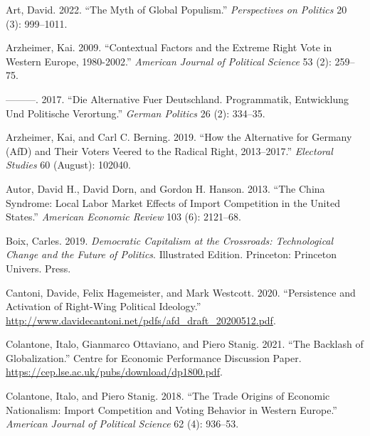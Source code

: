 \documentclass[
]{article}
\newlength{\cslhangindent}
\newlength{\cslentryspacingunit} %
\newenvironment{CSLReferences}[2] %
 {%
  \setlength{\parindent}{0pt}
  \ifodd #1
  \let\oldpar\par
  \def\par{\hangindent=\cslhangindent\oldpar}
  \fi
  \setlength{\parskip}{#2\cslentryspacingunit}
 }%
 {}
\begin{document}
\hypertarget{refs}{}
\begin{CSLReferences}{1}{0}
\leavevmode{}%
Art, David. 2022. {``The {Myth} of {Global} {Populism}.''}
\emph{Perspectives on Politics} 20 (3): 999--1011.

\leavevmode{}%
Arzheimer, Kai. 2009. {``Contextual {Factors} and the {Extreme} {Right}
{Vote} in {Western} {Europe}, 1980-2002.''} \emph{American Journal of
Political Science} 53 (2): 259--75.

\leavevmode{}%
---------. 2017. {``Die {Alternative} Fuer {Deutschland}.
{Programmatik}, {Entwicklung} Und Politische {Verortung}.''}
\emph{German Politics} 26 (2): 334--35.

\leavevmode{}%
Arzheimer, Kai, and Carl C. Berning. 2019. {``How the {Alternative} for
{Germany} ({AfD}) and Their Voters Veered to the Radical Right,
2013--2017.''} \emph{Electoral Studies} 60 (August): 102040.

\leavevmode{}%
Autor, David H., David Dorn, and Gordon H. Hanson. 2013. {``The {China}
{Syndrome}: {Local} {Labor} {Market} {Effects} of {Import} {Competition}
in the {United} {States}.''} \emph{American Economic Review} 103 (6):
2121--68.

\leavevmode{}%
Boix, Carles. 2019. \emph{Democratic {Capitalism} at the {Crossroads}:
{Technological} {Change} and the {Future} of {Politics}}. Illustrated
Edition. Princeton: Princeton Univers. Press.

\leavevmode{}%
Cantoni, Davide, Felix Hagemeister, and Mark Westcott. 2020.
{``Persistence and {Activation} of {Right}-{Wing} {Political}
{Ideology}.''}
\url{http://www.davidecantoni.net/pdfs/afd_draft_20200512.pdf}.

\leavevmode{}%
Colantone, Italo, Gianmarco Ottaviano, and Piero Stanig. 2021. {``The
Backlash of Globalization.''} Centre for {Economic} {Performance}
{Discussion} {Paper}.
\url{https://cep.lse.ac.uk/pubs/download/dp1800.pdf}.

\leavevmode{}%
Colantone, Italo, and Piero Stanig. 2018. {``The {Trade} {Origins} of
{Economic} {Nationalism}: {Import} {Competition} and {Voting} {Behavior}
in {Western} {Europe}.''} \emph{American Journal of Political Science}
62 (4): 936--53.


\end{CSLReferences}
\end{document}
